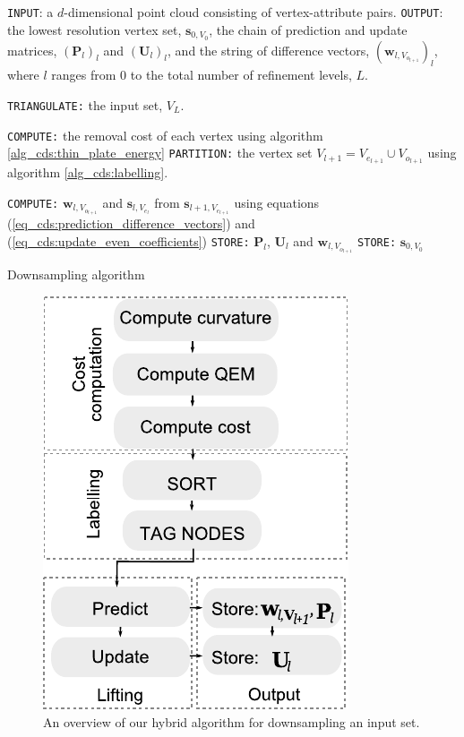 \documentclass[graybox]{svmult}
\begin{document}
	\begin{algorithm}[t]
		\begin{algorithmic}
			\STATE \texttt{INPUT}: a $d$-dimensional point cloud consisting of vertex-attribute pairs.
			\STATE \texttt{OUTPUT}: the lowest resolution vertex set, $\mathbf{s}_{0, V_0}$, the chain of prediction and update matrices, $(\mathbf{P}_l)_l$ and $(\mathbf{U}_l)_l$, and
			the string of difference vectors, $(\mathbf{w}_{l,V_{o_{l+1}}})_l$, where $l$ ranges from $0$ to the total number of refinement levels, $L$.
			
			\STATE \texttt{TRIANGULATE:} the input set, $V_L$.
			
			
			\STATE \texttt{COMPUTE:} the removal cost of each vertex using algorithm \ref{alg_cds:thin_plate_energy}
			\STATE \texttt{PARTITION:} the vertex set $V_{l+1} = V_{e_{l+1}} \cup V_{o_{l+1}}$ using algorithm \ref{alg_cds:labelling}.
			
			\STATE \texttt{COMPUTE:} $\mathbf{w}_{l,V_{o_{l+1}}}$ and $\mathbf{s}_{l,V_{e_{l}}}$ from $\mathbf{s}_{l+1,V_{e_{l+1}}}$ using equations (\ref{eq_cds:prediction_difference_vectors}) 
			and (\ref{eq_cds:update_even_coefficients})
			\STATE \texttt{STORE:} $\mathbf{P}_l$, $\mathbf{U}_l$ and $\mathbf{w}_{l,V_{o_{l+1}}}$
			\ENDFOR
			\STATE \texttt{STORE:}  $\mathbf{s}_{0,V_0}$
		\end{algorithmic}
		\caption{Downsampling algorithm}
		\label{alg_cds:downsampling}
	\end{algorithm}
	
	\begin{figure}[htb]
		\centering
		\includegraphics[width=.5\linewidth]{overview_downsampling_alg.pdf}
		\caption{\label{fig_cds:overview_downsampling}
			An overview of our hybrid algorithm for downsampling an input set.}
	\end{figure}
	
\end{document}
